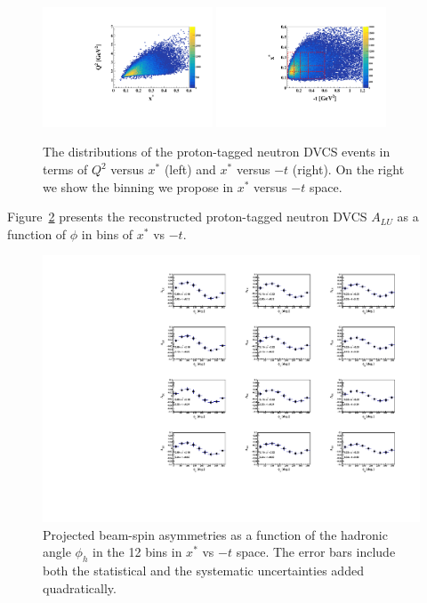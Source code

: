 \begin{figure}[htb]
  \centering
    \includegraphics[width=0.45\textwidth,clip]{figs/pdf/Q2_x_.pdf}
    \includegraphics[width=0.45\textwidth,clip]{figs/pdf/t_x_.pdf}
   \caption{The distributions of the proton-tagged neutron DVCS events in terms 
   of $Q^2$ versus $x^*$ (left) and  $x^{*}$ versus $-t$ (right). On the right 
   we show the binning we propose in $x^{*}$ versus $-t$ space.
   \label{fig:binning_x_t}}
\end{figure}


Figure~\ref{fig:alu_tagged} presents the reconstructed proton-tagged neutron 
DVCS  $A_{LU}$ as a function of $\phi$ in bins of $x^{*}$ vs $-t$.  

\begin{figure}[htb]
  \centering
    \includegraphics[width=1.1\textwidth,clip]{figs/pdf/BSA_incoherent_Phi_x_t.pdf}
  \caption{Projected beam-spin asymmetries as a function of the hadronic angle 
   $\phi_h$ in the 12 bins in $x^{*}$ vs $-t$ space. The error bars include 
   both the statistical and the systematic uncertainties added quadratically.
   \label{fig:alu_tagged}}
\end{figure}




